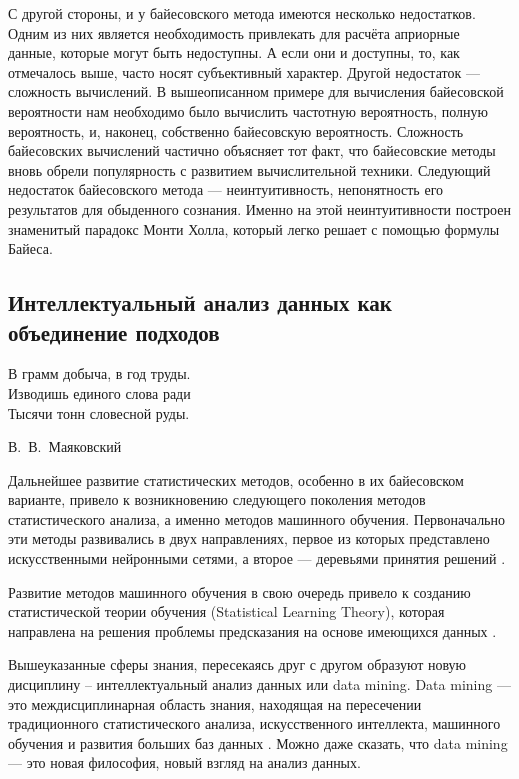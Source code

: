 С другой стороны, и у байесовского метода имеются несколько недостатков. Одним из них является необходимость привлекать для расчёта априорные данные, которые могут быть недоступны. А если они и доступны, то, как отмечалось выше, часто носят субъективный характер. Другой недостаток --- сложность вычислений. В вышеописанном примере для вычисления байесовской вероятности нам необходимо было вычислить частотную вероятность, полную вероятность, и, наконец, собственно байесовскую вероятность. Сложность байесовских вычислений частично объясняет тот факт, что байесовские методы вновь обрели популярность с развитием вычислительной техники. Следующий недостаток байесовского метода --- неинтуитивность, непонятность его результатов для обыденного сознания. Именно на этой неинтуитивности построен знаменитый парадокс Монти Холла, который легко решает с помощью формулы Байеса.

\subsection{Интеллектуальный анализ данных как объединение подходов}

\epigraph{В грамм добыча, в год труды.\\
	Изводишь единого слова ради\\
	Тысячи тонн словесной руды.}{В.~В.~Маяковский}

Дальнейшее развитие статистических методов, особенно в их байесовском варианте, привело к возникновению следующего поколения методов статистического анализа, а именно методов машинного обучения. Первоначально эти методы развивались в двух направлениях, первое из которых представлено искусственными нейронными сетями, а второе --- деревьями принятия решений \cite[стр. 11-12]{handbook_stat_dm}.

Развитие методов машинного обучения в свою очередь привело к созданию статистической теории обучения (Statistical Learning Theory), которая направлена на решения проблемы предсказания на основе имеющихся данных \cite[стр. 12-13]{handbook_stat_dm}.

Вышеуказанные сферы знания, пересекаясь друг с другом образуют новую дисциплину -- интеллектуальный анализ данных или data mining. Data mining --- это междисциплинарная область знания, находящая на пересечении традиционного статистического анализа, искусственного интеллекта, машинного обучения и развития больших баз данных \cite[стр. 5]{handbook_stat_dm}. Можно даже сказать, что data mining --- это новая философия, новый взгляд на анализ данных. 

